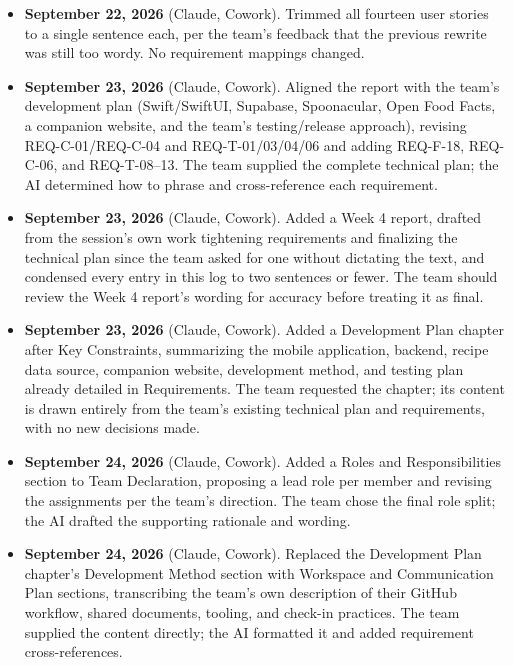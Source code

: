 \begin{itemize}[leftmargin=1.4em]
\item \textbf{September 22, 2026} (Claude, Cowork). Trimmed all fourteen user stories to a single sentence each, per the team's feedback that the previous rewrite was still too wordy. No requirement mappings changed.

\item \textbf{September 23, 2026} (Claude, Cowork). Aligned the report with the team's development plan (Swift/SwiftUI, Supabase, Spoonacular, Open Food Facts, a companion website, and the team's testing/release approach), revising REQ-C-01/REQ-C-04 and REQ-T-01/03/04/06 and adding REQ-F-18, REQ-C-06, and REQ-T-08--13. The team supplied the complete technical plan; the AI determined how to phrase and cross-reference each requirement.

\item \textbf{September 23, 2026} (Claude, Cowork). Added a Week 4 report, drafted from the session's own work tightening requirements and finalizing the technical plan since the team asked for one without dictating the text, and condensed every entry in this log to two sentences or fewer. The team should review the Week 4 report's wording for accuracy before treating it as final.

\item \textbf{September 23, 2026} (Claude, Cowork). Added a Development Plan chapter after Key Constraints, summarizing the mobile application, backend, recipe data source, companion website, development method, and testing plan already detailed in Requirements. The team requested the chapter; its content is drawn entirely from the team's existing technical plan and requirements, with no new decisions made.

\item \textbf{September 24, 2026} (Claude, Cowork). Added a Roles and Responsibilities section to Team Declaration, proposing a lead role per member and revising the assignments per the team's direction. The team chose the final role split; the AI drafted the supporting rationale and wording.

\item \textbf{September 24, 2026} (Claude, Cowork). Replaced the Development Plan chapter's Development Method section with Workspace and Communication Plan sections, transcribing the team's own description of their GitHub workflow, shared documents, tooling, and check-in practices. The team supplied the content directly; the AI formatted it and added requirement cross-references.


\end{itemize}
